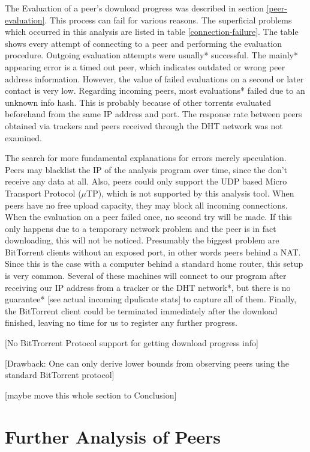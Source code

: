 \documentclass[10pt, a4paper, twoside, headsepline]{scrbook}
\renewcommand{\_}{\origunderscore\allowbreak}
\begin{document}
The Evaluation of a peer's download progress was described in section \ref{peer-evaluation}. This process can fail for various reasons. The superficial problems which occurred in this analysis are listed in table \ref{connection-failure}. The table shows every attempt of connecting to a peer and performing the evaluation procedure. Outgoing evaluation attempts were usually* successful. The mainly* appearing error is a timed out peer, which indicates outdated or wrong peer address information. However, the value of failed evaluations on a second or later contact is very low. Regarding incoming peers, most evaluations* failed due to an unknown info hash. This is probably because of other torrents evaluated beforehand from the same IP address and port. The response rate between peers obtained via trackers and peers received through the DHT network was not examined.

The search for more fundamental explanations for errors merely speculation. Peers may blacklist the IP of the analysis program over time, since the don't receive any data at all. Also, peers could only support the UDP based Micro Transport Protocol ($\mu$TP), which is not supported by this analysis tool. When peers have no free upload capacity, they may block all incoming connections. When the evaluation on a peer failed once, no second try will be made. If this only happens due to a temporary network problem and the peer is in fact downloading, this will not be noticed. Presumably the biggest problem are BitTorrent clients without an exposed port, in other words peers behind a NAT. Since this is the case with a computer behind a standard home router, this setup is very common. Several of these machines will connect to our program after receiving our IP address from a tracker or the DHT network*, but there is no guarantee* [see actual incoming dpulicate stats] to capture all of them. Finally, the BitTorrent client could be terminated immediately after the download finished, leaving no time for us to register any further progress.

[No BitTrorrent Protocol support for getting download progress info]

[Drawback: One can only derive lower bounds from observing peers using the standard BitTorrent protocol]

[maybe move this whole section to Conclusion]

\section{Further Analysis of Peers}
\end{document}
